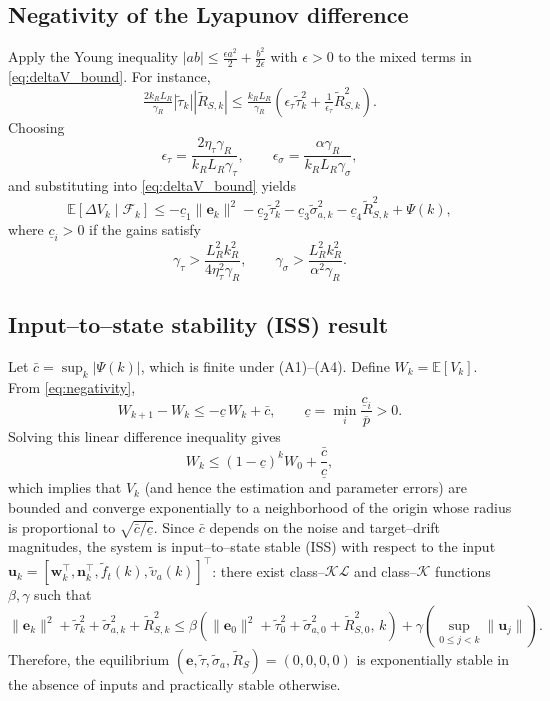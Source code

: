 \documentclass[10pt]{extarticle}
\begin{document}
\subsection{Negativity of the Lyapunov difference}

Apply the Young inequality $|ab| \le \frac{\epsilon a^2}{2} + \frac{b^2}{2\epsilon}$ with
$\epsilon>0$ to the mixed terms in \eqref{eq:deltaV_bound}. For instance,
\[
\tfrac{2 k_R L_R}{\gamma_R}|\tilde\tau_k||\tilde R_{S,k}|
\le
\tfrac{k_R L_R}{\gamma_R}\!\left(\epsilon_\tau \tilde\tau_k^2 + \tfrac{1}{\epsilon_\tau}\tilde R_{S,k}^2\right).
\]
Choosing
\[
\epsilon_\tau = \frac{2\eta_\tau \gamma_R}{k_R L_R \gamma_\tau},\qquad
\epsilon_\sigma = \frac{\alpha \gamma_R}{k_R L_R \gamma_\sigma},
\]
and substituting into \eqref{eq:deltaV_bound} yields
\begin{equation}
\mathbb{E}[\Delta V_k \mid \mathcal F_k]
\le
- \underline{c}_1 \|\boldsymbol{e}_k\|^2
- \underline{c}_2 \tilde\tau_k^2
- \underline{c}_3 \tilde\sigma_{a,k}^2
- \underline{c}_4 \tilde R_{S,k}^2
+ \Psi(k),
\label{eq:negativity}
\end{equation}
where $\underline{c}_i>0$ if the gains satisfy
\begin{equation}
\gamma_\tau > \frac{L_R^2 k_R^2}{4 \eta_\tau^2 \gamma_R},\qquad
\gamma_\sigma > \frac{L_R^2 k_R^2}{\alpha^2 \gamma_R}.
\label{eq:gain_conditions}
\end{equation}

\subsection{Input–to–state stability (ISS) result}

Let $\bar{c} = \sup_k |\Psi(k)|$, which is finite under (A1)–(A4).
Define $W_k = \mathbb{E}[V_k]$.
From \eqref{eq:negativity},
\[
W_{k+1} - W_k \le -\underline{c}\,W_k + \bar{c},
\qquad \underline{c} = \min_i \frac{\underline{c}_i}{\overline{p}} > 0.
\]
Solving this linear difference inequality gives
\[
W_k \le (1-\underline{c})^k W_0 + \frac{\bar{c}}{\underline{c}},
\]
which implies that $V_k$ (and hence the estimation and parameter errors) are bounded and converge
exponentially to a neighborhood of the origin whose radius is proportional to
$\sqrt{\bar{c}/\underline{c}}$.
Since $\bar{c}$ depends on the noise and target–drift magnitudes, the system is
input–to–state stable (ISS) with respect to the input
$\boldsymbol{u}_k = [\boldsymbol{w}_k^\top,\boldsymbol{n}_k^\top,\tilde f_t(k),\tilde v_a(k)]^\top$:
there exist class–$\mathcal{KL}$ and class–$\mathcal{K}$ functions $\beta,\gamma$ such that
\[
\|\boldsymbol{e}_k\|^2 + \tilde\tau_k^2 + \tilde\sigma_{a,k}^2 + \tilde R_{S,k}^2
\le \beta\!\left(\|\boldsymbol{e}_0\|^2+\tilde\tau_0^2+\tilde\sigma_{a,0}^2+\tilde R_{S,0}^2,\,k\right)
+ \gamma\!\left(\sup_{0\le j<k}\|\boldsymbol{u}_j\|\right).
\]
Therefore, the equilibrium $(\boldsymbol{e},\tilde\tau,\tilde\sigma_a,\tilde R_S)=(0,0,0,0)$
is exponentially stable in the absence of inputs and practically stable otherwise.
\end{document}
